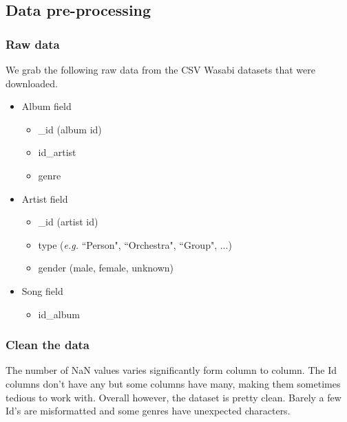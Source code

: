 \documentclass{article}
\begin{document}
\subsection{Data pre-processing}
\subsubsection{Raw data}

We grab the following raw data from the CSV Wasabi datasets that were downloaded.
\begin{itemize}
    \item Album field
          \begin{itemize}
              \item \_id (album id)
              \item id\_artist
              \item genre
          \end{itemize}
    \item Artist field
          \begin{itemize}
              \item \_id (artist id)
              \item type (\textit{e.g.} ``Person", ``Orchestra", ``Group", ...)
              \item gender (male, female, unknown)
          \end{itemize}
    \item Song field
          \begin{itemize}
              \item id\_album
          \end{itemize}
\end{itemize}

\subsubsection{Clean the data}
The number of NaN values varies significantly form column to column. The Id columns don't have any but some columns have many, making them sometimes tedious to work with.
Overall however, the dataset is pretty clean. Barely a few Id's are misformatted and some genres have unexpected characters.
\end{document}
